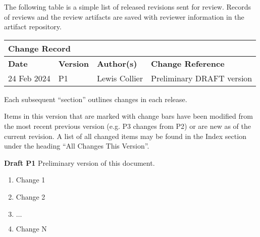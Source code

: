 
The following table is a simple list of released revisions sent for review.
Records of reviews and the review artifacts are saved with reviewer information in the \KNEADagencyName artifact repository.

\begin{table}[h]
	\centering 
		\begin{tabular}{|p{1.0in}|p{0.8in}|p{1.4in}|p{2.1in}|}
    \multicolumn{4}{l}{\bfseries Change Record} \\
		\hline
			{\bfseries Date}  &  {\bfseries Version} & {\bfseries Author(s)} & {\bfseries Change Reference} \\
		\hline
		\hline
			 24 Feb 2024	&	\centering	P1	&	{\raggedright Lewis Collier}	&	Preliminary DRAFT version  \\ \hline
		\hline		
		\hline				
  	\end{tabular}
\end{table}

Each subsequent ``section'' outlines changes in each release.

Items in this version that are marked with change bars have been modified from the most recent previous version (e.g. P3 changes from P2) or are new as of the current revision. A list of all changed items may be found in the Index section under the heading ``All Changes This Version''.

{\bf Draft P1}
Preliminary version of this document.

\begin{enumerate}[itemindent=5pt,topsep=0pt,itemsep=0pt,partopsep=0pt, parsep=0pt]
	\item Change 1            
	\item Change 2
	\item $\ldots$
	\item Change N            
\end{enumerate}


